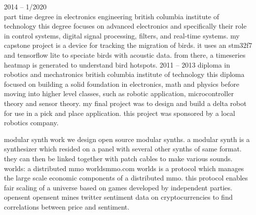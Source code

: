 \documentclass[9pt]{developercv} %
\begin{document}


\begin{entrylist}
	\entry
		{2014 -- 1/2020\\ \footnotesize{part time}}
		{degree in electronics engineering}
		{british columbia institute of technology}
		{this degree focuses on advanced electronics and specifically their role in control systems, digital signal processing, filters, and real-time systems. my capstone project is a device for tracking the migration of birds. it uses an stm32f7 and tensorflow lite to speciate birds with acoustic data. from there, a timeseries heatmap is generated to understand bird hotspots.}
	\entry
		{2011 -- 2013}
		{diploma in robotics and mechatronics}
		{british columbia institute of technology}
		{this diploma focused on building a solid foundation in electronics, math and physics before moving into higher level classes, such as robotic application, microcontroller theory and sensor theory. my final project was to design and build a delta robot for use in a pick and place application. this project was sponsored by a local robotics company.}
\end{entrylist}



\begin{entrylist}
	\entry
		{}
		{modular synth work}
		{}
		{we design open source modular synths. a modular synth is a synthesizer which resided on a panel with several other synths of same format. they can then be linked together with patch cables to make various sounds.}
	\entry
		{}
		{worlds: a distributed mmo}
		{worldsmmo.com}
		{worlds is a protocol which manages the large scale economic components of a distributed mmo. this protocol enables fair scaling of a universe based on games developed by independent parties.}
  \entry
		{}
		{opensent}
		{}
		{opensent mines twitter sentiment data on cryptocurrencies to find correlations between price and sentiment.}

\end{entrylist}
\end{document}
